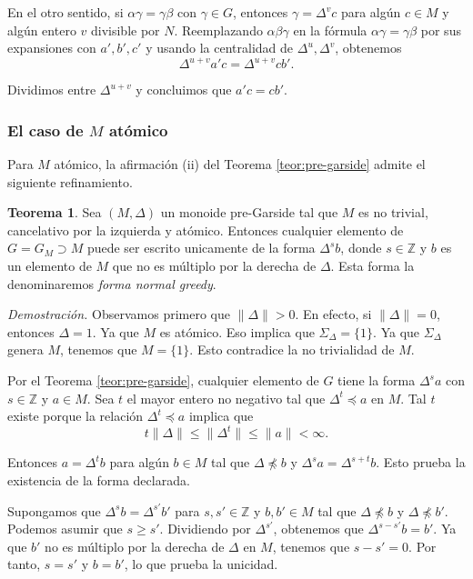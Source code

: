 \documentclass[12pt]{article}
\theoremstyle{definition}
\newtheorem{teor}{Teorema}[section]
\providecommand{\norm}[1]{\lVert#1\rVert}
\begin{document}
En el otro sentido, si $\alpha\gamma=\gamma\beta$ con $\gamma\in G$, entonces $\gamma=\Delta^v c$ para algún $c\in M$ y algún entero $v$ divisible por $N$. Reemplazando $\alpha\beta\gamma$ en la fórmula $\alpha\gamma=\gamma\beta$ por sus expansiones con $a',b',c'$ y usando la centralidad de $\Delta^u,\Delta^v$, obtenemos
$$\Delta^{u+v}a'c=\Delta^{u+v}cb'.$$

Dividimos entre $\Delta^{u+v}$ y concluimos que $a'c=cb'$.

\subsubsection{El caso de $M$ atómico}

Para $M$ atómico, la afirmación (ii) del Teorema \ref{teor:pre-garside} admite el siguiente refinamiento.

\begin{teor}
Sea $(M,\Delta)$ un monoide pre-Garside tal que $M$ es no trivial, cancelativo por la izquierda y atómico. Entonces cualquier elemento de $G=G_M\supset M$ puede ser escrito unicamente de la forma $\Delta^s b$, donde $s\in\mathbb{Z}$ y $b$ es un elemento de $M$ que no es múltiplo por la derecha de $\Delta$. Esta forma la denominaremos \textit{forma normal greedy}.
\label{teor:refi}
\end{teor}

\textit{Demostración.} Observamos primero que $\norm{\Delta}>0$. En efecto, si $\norm{\Delta}= 0$, entonces $\Delta=1$. Ya que $M$ es atómico. Eso implica que $\Sigma_\Delta=\{1\}$. Ya que $\Sigma_\Delta$ genera $M$, tenemos que $M=\{1\}$. Esto contradice la no trivialidad de $M$.

Por el Teorema \ref{teor:pre-garside}, cualquier elemento de $G$ tiene la forma $\Delta^sa$ con $s\in\mathbb{Z}$ y $a\in M$. Sea $t$ el mayor entero no negativo tal que $\Delta^t\preceq a$ en $M$. Tal $t$ existe porque la relación $\Delta^t\preceq a$ implica que
$$t\norm{\Delta}\leq \norm{\Delta^t}\leq \norm{a}<\infty.$$

Entonces $a=\Delta^t b$ para algún $b\in M$ tal que $\Delta\npreceq b$ y $\Delta^s a=\Delta^{s+t} b$. Esto prueba la existencia de la forma declarada.

Supongamos que $\Delta^s b=\Delta^{s'}b'$ para $s,s'\in\mathbb{Z}$ y $b,b'\in M$ tal que $\Delta\npreceq b$ y $\Delta\npreceq b'$. Podemos asumir que $s\geq s'$. Dividiendo por $\Delta^{s'}$, obtenemos que $\Delta^{s-s'}b=b'$. Ya que $b'$ no es múltiplo por la derecha de $\Delta$ en $M$, tenemos que $s-s'=0$. Por tanto, $s=s'$ y $b=b'$, lo que prueba la unicidad.
\end{document}

